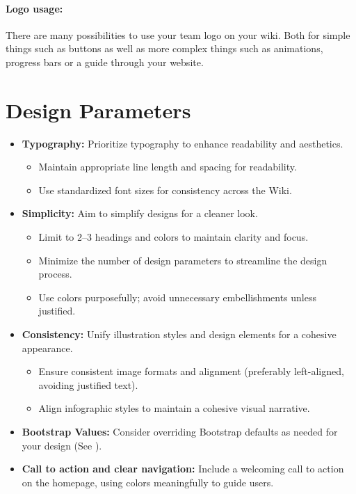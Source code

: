 \paragraph{Logo usage:} There are many possibilities to use your team logo on your wiki.
Both for simple things such as buttons as well as more complex things such as animations, progress bars or a guide through your website.

\section{Design Parameters} \label{sec:design-paramaters} 
\begin{itemize}
    \item \textbf{Typography:} Prioritize typography to enhance readability and aesthetics.
    \begin{itemize}
        \item Maintain appropriate line length and spacing for readability.
        \item Use standardized font sizes for consistency across the Wiki.
    \end{itemize}
    \item \textbf{Simplicity:} Aim to simplify designs for a cleaner look.
    \begin{itemize}
        \item Limit to 2--3 headings and colors to maintain clarity and focus.
        \item Minimize the number of design parameters to streamline the design process.
        \item Use colors purposefully; avoid unnecessary embellishments unless justified.
    \end{itemize}
    \item \textbf{Consistency:} Unify illustration styles and design elements for a cohesive appearance.
    \begin{itemize}
        \item Ensure consistent image formats and alignment (preferably left-aligned, avoiding justified text).
        \item Align infographic styles to maintain a cohesive visual narrative.
    \end{itemize}
    \item \textbf{Bootstrap Values:} Consider overriding Bootstrap defaults as needed for your design (See ).
    \item \textbf{Call to action and clear navigation:} Include a welcoming call to action on the homepage, using colors meaningfully to guide users.

\end{itemize}
